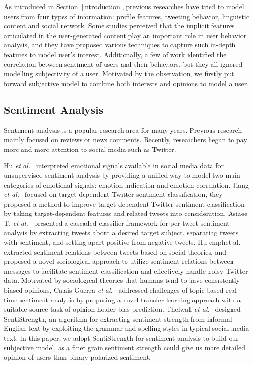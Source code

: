 \documentclass{acm_proc_article-sp}
\begin{document}
As introduced in Section~\ref{introduction}, previous researches have tried to model users from four types of information: profile features, tweeting behavior, linguistic content and social network. 
Some studies perceived that the implicit features articulated in the user-generated content play an important role in user behavior analysis, and they have proposed various techniques to capture such in-depth features to model user's interest. 
Additionally, a few of work identified the correlation between sentiment of users and their behaviors, but they all ignored modelling subjectivity of a user.
Motivated by the observation, we firstly put forward subjective model to combine both interests and opinions to model a user.

\subsection{Sentiment Analysis}
Sentiment analysis is a popular research area for many years. Previous research mainly focused on reviews or news comments. 
Recently, researchers began to pay more and more attention to social media such as Twitter.
 
Hu \emph{et al.}~\cite{Hu:2013www} interpreted emotional signals available in social media data for unsupervised sentiment analysis by providing a unified way to model two main categories of emotional signals: emotion indication and emotion correlation. 
Jiang \emph{et al.}~\cite{Jiang:2011TTS} focused on target-dependent Twitter sentiment classification, they proposed a method to improve target-dependent Twitter sentiment classification by taking target-dependent features and related tweets into consideration. 
Asiaee T. \emph{et al.}~\cite{AsiaeeT:2012} presented a cascaded classifier framework for per-tweet sentiment analysis by extracting tweets about a desired target subject, separating tweets with sentiment, and setting apart positive from negative tweets.
Hu emph{et al.}~\cite{Hu:2013ESR} extracted sentiment relations between tweets based on social theories, and proposed a novel sociological approach to utilize sentiment relations between messages to facilitate sentiment classification and effectively handle noisy Twitter data.
Motivated by sociological theories that humans tend to have consistently biased opinions, Calais Guerra \emph{et al.}~\cite{CalaisGuerra:2011BOT} addressed challenges of topic-based real-time sentiment analysis by proposing a novel transfer learning approach with a suitable source task of opinion holder bias prediction.
Thelwall \emph{et al.}~\cite{Thelwall:2010SSS,Thelwall:2012SSD} designed SentiStrength, an algorithm for extracting sentiment strength from informal English text by exploiting the grammar and spelling styles in typical social media text.
In this paper, we adopt SentiStrength for sentiment analysis to build our subjective model, as a finer grain sentiment strength could give us more detailed opinion of users than binary polarized sentiment.
\end{document}
